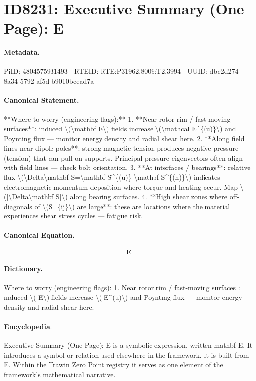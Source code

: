 \section*{ID8231: Executive Summary (One Page): E}
\paragraph{Metadata.}
PiID: 4804575931493 | RTEID: RTE:P31962.8009:T2.3994 | UUID: dbc2d274-8a34-5792-af5d-b9010bcead7a

\paragraph{Canonical Statement.}
**Where to worry (engineering flags):** 1. **Near rotor rim / fast-moving surfaces**: induced \textbackslash{}(\textbackslash{}mathbf E\textbackslash{}) fields increase \textbackslash{}(\textbackslash{}mathcal E\textasciicircum{}\{(u)\}\textbackslash{}) and Poynting flux — monitor energy density and radial shear here. 2. **Along field lines near dipole poles**: strong magnetic tension produces negative pressure (tension) that can pull on supports. Principal pressure eigenvectors often align with field lines — check bolt orientation. 3. **At interfaces / bearings**: relative flux \textbackslash{}(\textbackslash{}Delta\textbackslash{}mathbf S=\textbackslash{}mathbf S\textasciicircum{}\{(u)\}-\textbackslash{}mathbf S\textasciicircum{}\{(n)\}\textbackslash{}) indicates electromagnetic momentum deposition where torque and heating occur. Map \textbackslash{}(|\textbackslash{}Delta\textbackslash{}mathbf S|\textbackslash{}) along bearing surfaces. 4. **High shear zones where off-diagonals of \textbackslash{}(S\_\{ij\}\textbackslash{}) are large**: these are locations where the material experiences shear stress cycles — fatigue risk.

\paragraph{Canonical Equation.}
\[
\mathbf E
\]

\paragraph{Dictionary.}
Where to worry (engineering flags): 1. Near rotor rim / fast-moving surfaces : induced \textbackslash{}( E\textbackslash{}) fields increase \textbackslash{}( E\textasciicircum{}(u)\textbackslash{}) and Poynting flux — monitor energy density and radial shear here.

\paragraph{Encyclopedia.}
Executive Summary (One Page): E is a symbolic expression, written mathbf E. It introduces a symbol or relation used elsewhere in the framework. It is built from E. Within the Trawin Zero Point registry it serves as one element of the framework's mathematical narrative.
